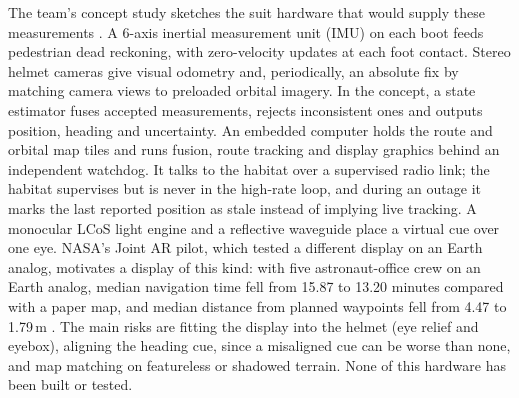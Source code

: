 The team's concept study sketches the suit hardware that would supply these measurements \citep{marswalkconcept2026}. A 6-axis inertial measurement unit (IMU) on each boot feeds pedestrian dead reckoning, with zero-velocity updates at each foot contact. Stereo helmet cameras give visual odometry and, periodically, an absolute fix by matching camera views to preloaded orbital imagery. In the concept, a state estimator fuses accepted measurements, rejects inconsistent ones and outputs position, heading and uncertainty. An embedded computer holds the route and orbital map tiles and runs fusion, route tracking and display graphics behind an independent watchdog. It talks to the habitat over a supervised radio link; the habitat supervises but is never in the high-rate loop, and during an outage it marks the last reported position as stale instead of implying live tracking. A monocular LCoS light engine and a reflective waveguide place a virtual cue over one eye. NASA's Joint AR pilot, which tested a different display on an Earth analog, motivates a display of this kind: with five astronaut-office crew on an Earth analog, median navigation time fell from 15.87 to 13.20 minutes compared with a paper map, and median distance from planned waypoints fell from 4.47 to 1.79\,m \citep{smith2026jointar}. The main risks are fitting the display into the helmet (eye relief and eyebox), aligning the heading cue, since a misaligned cue can be worse than none, and map matching on featureless or shadowed terrain. None of this hardware has been built or tested.
